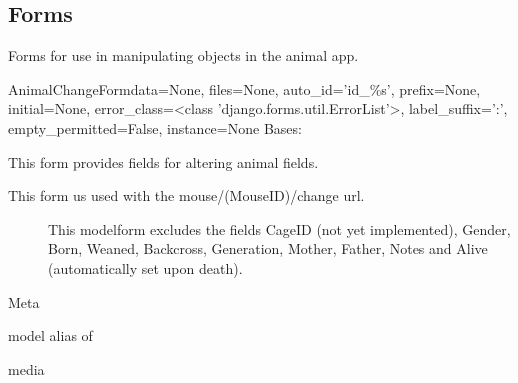 \documentclass[letterpaper,10pt,english]{sphinxmanual}
\begin{document}
\subsection{Forms}
\hypertarget{module-animal.forms}{}
\modulesynopsis{}
Forms for use in manipulating objects in the animal app.

\hypertarget{animal.forms.AnimalChangeForm}{}\begin{classdesc}{AnimalChangeForm}{data=None, files=None, auto\_id='id\_\%s', prefix=None, initial=None, error\_class=\textless{}class 'django.forms.util.ErrorList'\textgreater{}, label\_suffix=':', empty\_permitted=False, instance=None}
Bases: 

This form provides fields for altering animal fields.
\begin{description}
\item[This form us used with the mouse/(MouseID)/change url.] \leavevmode
This modelform excludes the fields CageID (not yet implemented), Gender, Born, Weaned, Backcross, Generation, Mother, Father, Notes and Alive (automatically set upon death).

\end{description}

\hypertarget{animal.forms.AnimalChangeForm.Meta}{}\begin{classdesc}{Meta}{}~

\hypertarget{animal.forms.AnimalChangeForm.Meta.model}{}\begin{memberdesc}{model}
alias of 
\end{memberdesc}
\end{classdesc}

\hypertarget{animal.forms.AnimalChangeForm.media}{}\begin{memberdesc}[AnimalChangeForm]{media}\end{memberdesc}
\end{classdesc}
\end{document}
